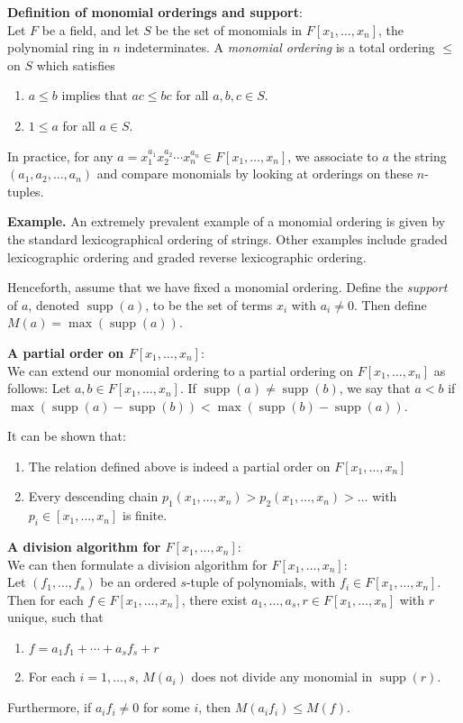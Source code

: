 \documentclass[12pt]{article}
\newcommand{\supp}{\operatorname{supp}}
\begin{document}
{\bf Definition of monomial orderings and support}:\\
Let $F$ be a field, and let $S$ be the set of monomials in $F[x_1,\ldots,x_n]$, the polynomial ring in $n$ indeterminates.
A {\em monomial ordering} is a total ordering $\leq$ on $S$ which satisfies
\begin{enumerate}
\item $a \leq b$ implies that $ac \leq bc$ for all $a,b,c \in S$.
\item $1 \leq a$ for all $a \in S$.
\end{enumerate}

In practice, for any $a=x_1^{a_1}x_2^{a_2}\cdots x_n^{a_n} \in F[x_1,\ldots,x_n]$, we associate to $a$ the string $(a_1,a_2,\ldots,a_n)$ and compare monomials by looking at orderings on these $n$-tuples.

\textbf{Example.}
An extremely prevalent example of a monomial ordering is given by the standard lexicographical ordering of strings.  Other examples include graded lexicographic ordering and graded reverse lexicographic ordering.

Henceforth, assume that we have fixed a monomial ordering.    Define the {\em support} of $a$, denoted $\supp(a)$, to be the set of terms $x_i$ with $a_i\neq 0$.  Then define $M(a)=\max(\supp(a))$.

{\bf A partial order on $F[x_1,\ldots,x_n]$}:\\
We can extend our monomial ordering to a partial ordering on $F[x_1,\ldots,x_n]$ as follows:
Let $a,b \in F[x_1,\ldots,x_n]$.  If $\supp(a) \neq \supp(b)$, we say that
$a < b$ if $\max(\supp(a)-\supp(b)) < \max(\supp(b)-\supp(a))$.

It can be shown that:
\begin{enumerate}
\item The relation defined above is indeed a partial order on $F[x_1,\ldots,x_n]$
\item Every descending chain $p_1(x_1,\ldots,x_n) > p_2(x_1,\ldots,x_n) > \ldots$ with $p_i \in [x_1,\ldots,x_n]$ is finite.
\end{enumerate}

{\bf A division algorithm for $F[x_1,\ldots,x_n]$}:\\
We can then formulate a division algorithm for $F[x_1,\ldots,x_n]$:\\
Let $(f_1,\ldots,f_s)$ be an ordered $s$-tuple of polynomials, with $f_i \in F[x_1,\ldots,x_n]$.  Then for each $f \in F[x_1,\ldots,x_n]$, there exist $a_1,\ldots,a_s, r \in F[x_1,\ldots,x_n]$ with $r$ unique, such that
\begin{enumerate}
\item $f=a_1f_1+\cdots+a_sf_s+r$
\item For each $i=1,\ldots,s$, $M(a_i)$ does not divide any monomial in $\supp(r)$.
\end{enumerate}
Furthermore, if $a_if_i \neq 0$ for some $i$, then $M(a_if_i) \leq M(f)$.\\
\end{document}
